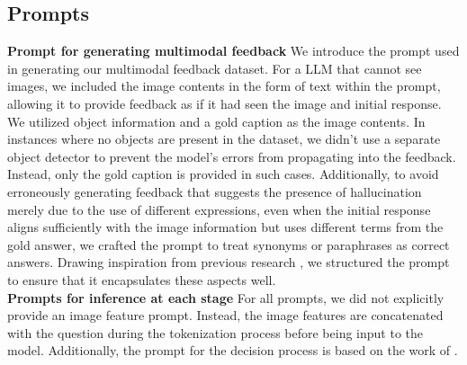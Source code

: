 \documentclass[11pt]{article}
\begin{document}
\subsection{Prompts}
\textbf{Prompt for generating multimodal feedback} We introduce the prompt used in generating our multimodal feedback dataset. For a LLM that cannot see images, we included the image contents in the form of text within the prompt, allowing it to provide feedback as if it had seen the image and initial response. We utilized object information and a gold caption as the image contents. In instances where no objects are present in the dataset, we didn't use a separate object detector to prevent the model's errors from propagating into the feedback. Instead, only the gold caption is provided in such cases. Additionally, to avoid erroneously generating feedback that suggests the presence of hallucination merely due to the use of different expressions, even when the initial response aligns sufficiently with the image information but uses different terms from the gold answer, we crafted the prompt to treat synonyms or paraphrases as correct answers. Drawing inspiration from previous research \citep{kim2023prometheus}, we structured the prompt to ensure that it encapsulates these aspects well. \\
\textbf{Prompts for inference at each stage} For all prompts, we did not explicitly provide an image feature prompt. Instead, the image features are concatenated with the question during the tokenization process before being input to the model. Additionally, the prompt for the decision process is based on the work of \citep{liu2023improved}.
\end{document}
